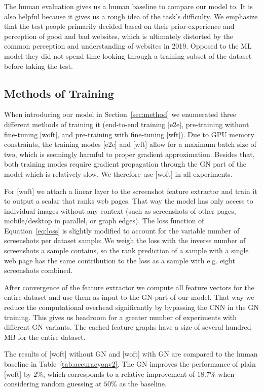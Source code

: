 The human evaluation gives us a human baseline to compare our model to. It is also helpful because it gives us a rough idea of the task's difficulty. We emphasize that the test people primarily decided based on their prior-experience and perception of good and bad websites, which is ultimately distorted by the common perception and understanding of websites in 2019. Opposed to the ML model they did not spend time looking through a training subset of the dataset before taking the test.

\subsection{Methods of Training}

When introducing our model in Section~\ref{sec:method} we enumerated three different methods of training it (end-to-end training [e2e], pre-training without fine-tuning [woft], and pre-training with fine-tuning [wft]). Due to GPU memory constraints, the training modes [e2e] and [wft] allow for a maximum batch size of two, which is seemingly harmful to proper gradient approximation. Besides that, both training modes require gradient propagation through the GN part of the model which is relatively slow. We therefore use [woft] in all experiments.

For [woft] we attach a linear layer to the screenshot feature extractor and train it to output a scalar that ranks web pages. That way the model has only access to individual images without any context (such as screenshots of other pages, mobile/desktop in parallel, or graph edges). The loss function of Equation~\ref{eq:loss} is slightly modified to account for the variable number of screenshots per dataset sample: We weigh the loss with the inverse number of screenshots a sample contains, so the rank prediction of a sample with a single web page has the same contribution to the loss as a sample with e.g. eight screenshots combined. 

After convergence of the feature extractor we compute all feature vectors for the entire dataset and use them as input to the GN part of our model. That way we reduce the computational overhead significantly by bypassing the CNN in the GN training. This gives us headroom for a greater number of experiments with different GN variants. The cached feature graphs have a size of several hundred MB for the entire dataset.

The results of [woft] without GN and [woft] with GN are compared to the human baseline in Table~\ref{tab:accuracyonv2}. The GN improves the performance of plain [woft] by $2\%$, which corresponds to a relative improvement of $18.7\%$ when considering random guessing at $50\%$ as the baseline.

